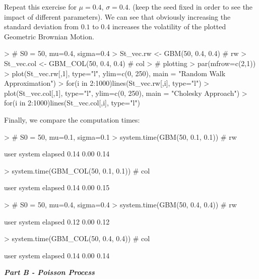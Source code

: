 \documentclass{article}
\begin{document}
\newpage
Repeat this exercise for $\mu = 0.4$, $\sigma = 0.4$. (keep the seed fixed in order to see the impact of different parameters). We can see that obviously increasing the standard deviation from $0.1$ to $0.4$ increases the volatility of the plotted Geometric Brownian Motion.\\
\begin{Schunk}
\begin{Sinput}
> # S0 = 50, mu=0.4, sigma=0.4
> St_vec.rw <- GBM(50, 0.4, 0.4) # rw
> St_vec.col <- GBM_COL(50, 0.4, 0.4) # col
> # plotting
> par(mfrow=c(2,1))
> plot(St_vec.rw[,1], type="l", ylim=c(0, 250), main = "Random Walk Approximation")
> for(i in 2:1000){lines(St_vec.rw[,i], type="l")}
> plot(St_vec.col[,1], type="l", ylim=c(0, 250), main = "Cholesky Approach")
> for(i in 2:1000){lines(St_vec.col[,i], type="l")}
\end{Sinput}
\end{Schunk}

\newpage
Finally, we compare the computation times:
\begin{Schunk}
\begin{Sinput}
> # S0 = 50, mu=0.1, sigma=0.1
> system.time(GBM(50, 0.1, 0.1)) # rw
\end{Sinput}
\begin{Soutput}
   user  system elapsed 
   0.14    0.00    0.14 
\end{Soutput}
\begin{Sinput}
> system.time(GBM_COL(50, 0.1, 0.1)) # col
\end{Sinput}
\begin{Soutput}
   user  system elapsed 
   0.14    0.00    0.15 
\end{Soutput}
\begin{Sinput}
> # S0 = 50, mu=0.4, sigma=0.4
> system.time(GBM(50, 0.4, 0.4)) # rw
\end{Sinput}
\begin{Soutput}
   user  system elapsed 
   0.12    0.00    0.12 
\end{Soutput}
\begin{Sinput}
> system.time(GBM_COL(50, 0.4, 0.4)) # col
\end{Sinput}
\begin{Soutput}
   user  system elapsed 
   0.14    0.00    0.14 
\end{Soutput}
\end{Schunk}



\newpage
\textbf{\textit{Part B - Poisson Process}} \\
\end{document}
